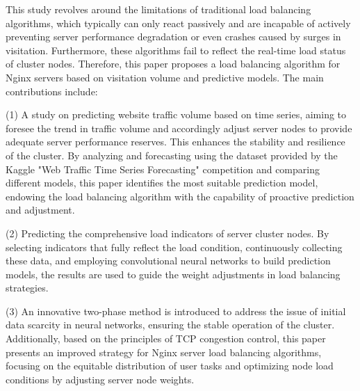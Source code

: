 \begin{eabstract}

	This study revolves around the limitations of traditional load balancing algorithms, which typically can only react passively and are incapable of actively preventing server performance degradation or even crashes caused by surges in visitation. Furthermore, these algorithms fail to reflect the real-time load status of cluster nodes. Therefore, this paper proposes a load balancing algorithm for Nginx servers based on visitation volume and predictive models. The main contributions include:

	(1) A study on predicting website traffic volume based on time series, aiming to foresee the trend in traffic volume and accordingly adjust server nodes to provide adequate server performance reserves. This enhances the stability and resilience of the cluster. By analyzing and forecasting using the dataset provided by the Kaggle "Web Traffic Time Series Forecasting" competition and comparing different models, this paper identifies the most suitable prediction model, endowing the load balancing algorithm with the capability of proactive prediction and adjustment.

	(2) Predicting the comprehensive load indicators of server cluster nodes. By selecting indicators that fully reflect the load condition, continuously collecting these data, and employing convolutional neural networks to build prediction models, the results are used to guide the weight adjustments in load balancing strategies.

	(3) An innovative two-phase method is introduced to address the issue of initial data scarcity in neural networks, ensuring the stable operation of the cluster. Additionally, based on the principles of TCP congestion control, this paper presents an improved strategy for Nginx server load balancing algorithms, focusing on the equitable distribution of user tasks and optimizing node load conditions by adjusting server node weights.

\end{eabstract}

